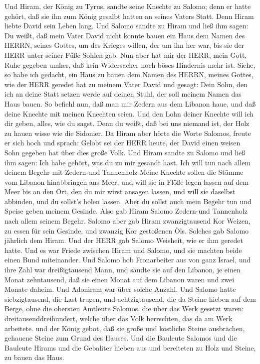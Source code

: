  Und Hiram, der König zu Tyrus, sandte seine Knechte zu
Salomo; denn er hatte gehört, daß sie ihn zum König gesalbt hatten an
seines Vaters Statt. Denn Hiram liebte David sein Leben lang.
 Und Salomo sandte zu Hiram und ließ ihm sagen: 
Du weißt, daß mein Vater David nicht konnte bauen ein Haus dem Namen des
HERRN, seines Gottes, um des Krieges willen, der um ihn her war, bis sie
der HERR unter seiner Füße Sohlen gab.  Nun aber hat mir der
HERR, mein Gott, Ruhe gegeben umher, daß kein Widersacher noch böses
Hindernis mehr ist.  Siehe, so habe ich gedacht, ein Haus zu
bauen dem Namen des HERRN, meines Gottes, wie der HERR geredet hat zu
meinem Vater David und gesagt: Dein Sohn, den ich an deine Statt setzen
werde auf deinen Stuhl, der soll meinem Namen das Haus bauen.
 So befiehl nun, daß man mir Zedern aus dem Libanon haue,
und daß deine Knechte mit meinen Knechten seien. Und den Lohn deiner
Knechte will ich dir geben, alles, wie du sagst. Denn du weißt, daß bei
uns niemand ist, der Holz zu hauen wisse wie die Sidonier. 
Da Hiram aber hörte die Worte Salomos, freute er sich hoch und sprach:
Gelobt sei der HERR heute, der David einen weisen Sohn gegeben hat über
dies große Volk.  Und Hiram sandte zu Salomo und ließ ihm
sagen: Ich habe gehört, was du zu mir gesandt hast. Ich will tun nach
allem deinem Begehr mit Zedern-und Tannenholz  Meine Knechte
sollen die Stämme vom Libanon hinabbringen ans Meer, und will sie in
Flöße legen lassen auf dem Meer bis an den Ort, den du mir wirst ansagen
lassen, und will sie daselbst abbinden, und du sollst's holen lassen.
Aber du sollst auch mein Begehr tun und Speise geben meinem Gesinde.
 Also gab Hiram Salomo Zedern-und Tannenholz nach allem
seinem Begehr.  Salomo aber gab Hiram zwanzigtausend Kor
Weizen, zu essen für sein Gesinde, und zwanzig Kor gestoßenen Öls.
Solches gab Salomo jährlich dem Hiram.  Und der HERR gab
Salomo Weisheit, wie er ihm geredet hatte. Und es war Friede zwischen
Hiram und Salomo, und sie machten beide einen Bund miteinander.
 Und Salomo hob Fronarbeiter aus von ganz Israel, und ihre
Zahl war dreißigtausend Mann,  und sandte sie auf den
Libanon, je einen Monat zehntausend, daß sie einen Monat auf dem Libanon
waren und zwei Monate daheim. Und Adoniram war über solche Anzahl.
 Und Salomo hatte siebzigtausend, die Last trugen, und
achtzigtausend, die da Steine hieben auf dem Berge,  ohne
die obersten Amtleute Salomos, die über das Werk gesetzt waren:
dreitausenddreihundert, welche über das Volk herrschten, das da am Werk
arbeitete.  und der König gebot, daß sie große und
köstliche Steine ausbrächen, gehauene Steine zum Grund des Hauses.
 Und die Bauleute Salomos und die Bauleute Hirams und die
Gebaliter hieben aus und bereiteten zu Holz und Steine, zu bauen das
Haus.

